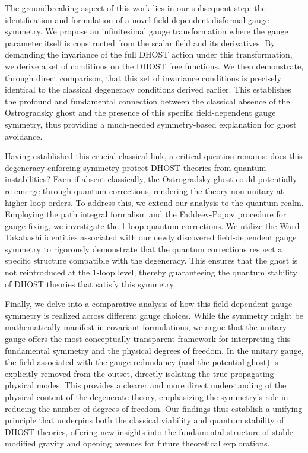 \documentclass[twocolumn]{aastex631}
\begin{document}
The groundbreaking aspect of this work lies in our subsequent step: the identification and formulation of a novel field-dependent disformal gauge symmetry. We propose an infinitesimal gauge transformation where the gauge parameter itself is constructed from the scalar field and its derivatives. By demanding the invariance of the full DHOST action under this transformation, we derive a set of conditions on the DHOST free functions. We then demonstrate, through direct comparison, that this set of invariance conditions is precisely identical to the classical degeneracy conditions derived earlier. This establishes the profound and fundamental connection between the classical absence of the Ostrogradsky ghost and the presence of this specific field-dependent gauge symmetry, thus providing a much-needed symmetry-based explanation for ghost avoidance.

Having established this crucial classical link, a critical question remains: does this degeneracy-enforcing symmetry protect DHOST theories from quantum instabilities? Even if absent classically, the Ostrogradsky ghost could potentially re-emerge through quantum corrections, rendering the theory non-unitary at higher loop orders. To address this, we extend our analysis to the quantum realm. Employing the path integral formalism and the Faddeev-Popov procedure for gauge fixing, we investigate the 1-loop quantum corrections. We utilize the Ward-Takahashi identities associated with our newly discovered field-dependent gauge symmetry to rigorously demonstrate that the quantum corrections respect a specific structure compatible with the degeneracy. This ensures that the ghost is not reintroduced at the 1-loop level, thereby guaranteeing the quantum stability of DHOST theories that satisfy this symmetry.

Finally, we delve into a comparative analysis of how this field-dependent gauge symmetry is realized across different gauge choices. While the symmetry might be mathematically manifest in covariant formulations, we argue that the unitary gauge offers the most conceptually transparent framework for interpreting this fundamental symmetry and the physical degrees of freedom. In the unitary gauge, the field associated with the gauge redundancy (and the potential ghost) is explicitly removed from the outset, directly isolating the true propagating physical modes. This provides a clearer and more direct understanding of the physical content of the degenerate theory, emphasizing the symmetry's role in reducing the number of degrees of freedom. Our findings thus establish a unifying principle that underpins both the classical viability and quantum stability of DHOST theories, offering new insights into the fundamental structure of stable modified gravity and opening avenues for future theoretical explorations.
\end{document}
